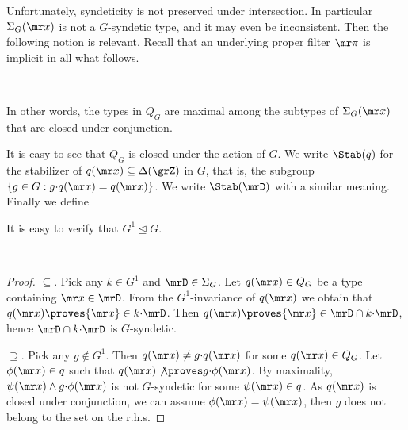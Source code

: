 Unfortunately, syndeticity is not preserved under intersection.
In particular $\Sigma_G({\mr x})$ is not a $G$-syndetic type, and it may even be inconsistent.
Then the following notion is relevant.
Recall that an underlying proper filter ${\mr\pi}$ is implicit in all what follows.

\begin{definition}\label{def_Q}\ 

  \smallskip

  In other words, the types in $Q_G$ are maximal among the subtypes of $\Sigma_G({\mr x})$ that are closed under conjunction.
\end{definition}

It is easy to see that $Q_G$ is closed under the action of $G$.
We write $\Stab(q)$ for the stabilizer of $q({\mr x})\subseteq\Delta(\grZ)$ in $G$, that is, the subgroup $\{g\in G:g{\cdot}q({\mr x})=q({\mr x})\}$.
We write $\Stab(\mrD)$ with a similar meaning.
Finally we define


It is easy to verify that $G^1\trianglelefteq G$.

\begin{proposition}\label{prop_StabQ}\ \smallskip

  \smallskip
\end{proposition}

\begin{proof}
  $\subseteq$.
  Pick any $k\in G^1$ and $\mrD\in\Sigma_G$.
  Let $q({\mr x})\in Q_G$ be a type containing ${\mr x}\in\mrD$.
  From the $G^1$-invariance of $q({\mr x})$ we obtain that $q({\mr x})\proves {\mr x}\in k{\cdot}\mrD$.
  Then $q({\mr x})\proves {\mr x}\in \mrD\cap k{\cdot}\mrD$, hence $\mrD\cap k{\cdot}\mrD$ is $G$-syndetic.

  $\supseteq$.
  Pick any $g\notin G^1$.
  Then $q({\mr x})\neq g{\cdot}q({\mr x})$ for some $q({\mr x})\in Q_G$.
  Let $\phi({\mr x})\in q$ such that $q({\mr x})\not\proves g{\cdot}\phi({\mr x})$.
  By maximality, $\psi({\mr x})\wedge g{\cdot}\phi({\mr x})$ is not $G$-syndetic for some $\psi({\mr x})\in q$.
  As $q({\mr x})$ is closed under conjunction, we can assume $\phi({\mr x})=\psi({\mr x})$, then $g$ does not belong to the set on the r.h.s.
\end{proof}


